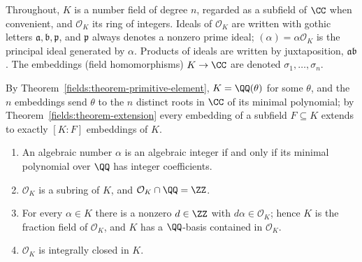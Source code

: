 \begin{notation}\label{algebraic-number-theory:notation-number-fields}
Throughout, $K$ is a number field of degree $n$, regarded as a subfield of $\CC$ when convenient, and $\mathcal{O}_K$ its ring of integers. Ideals of $\mathcal{O}_K$ are written with gothic letters
$\mathfrak{a}, \mathfrak{b}, \mathfrak{p}$, and $\mathfrak{p}$ always denotes a nonzero prime ideal; $(\alpha) = \alpha\mathcal{O}_K$ is the principal ideal generated by $\alpha$. Products of ideals are written by
juxtaposition, $\mathfrak{a}\mathfrak{b}$. The embeddings (field homomorphisms) $K \to \CC$ are denoted $\sigma_1, \dots, \sigma_n$.
\end{notation}

By Theorem~\ref{fields:theorem-primitive-element}, $K = \QQ(\theta)$ for some $\theta$, and the $n$ embeddings send $\theta$ to the $n$ distinct roots in $\CC$ of its minimal polynomial; by
Theorem~\ref{fields:theorem-extension} every embedding of a subfield $F \subseteq K$ extends to exactly $[K : F]$ embeddings of $K$.

\begin{proposition}\label{algebraic-number-theory:proposition-algebraic-integers}
\begin{enumerate}
\item An algebraic number $\alpha$ is an algebraic integer if and only if its minimal polynomial over $\QQ$ has integer coefficients.
\item $\mathcal{O}_K$ is a subring of $K$, and $\mathcal{O}_K \cap \QQ = \ZZ$.
\item For every $\alpha \in K$ there is a nonzero $d \in \ZZ$ with $d\alpha \in \mathcal{O}_K$; hence $K$ is the fraction field of $\mathcal{O}_K$, and $K$ has a $\QQ$-basis contained in $\mathcal{O}_K$.
\item $\mathcal{O}_K$ is integrally closed in $K$.
\end{enumerate}
\end{proposition}

